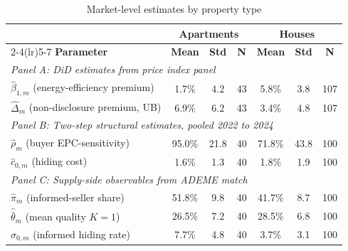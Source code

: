 \documentclass[10pt,letterpaper]{bp-template-concise}
\begin{document}
\begin{table}[H]
\centering
\caption{Market-level estimates by property type}
\label{tab:did_results}
\small\renewcommand{\arraystretch}{1.3}
\begin{tabular*}{\textwidth}{@{\extracolsep{\fill}}l*{6}{c}@{}}
\toprule\toprule
 & \multicolumn{3}{c}{\textbf{Apartments}} & \multicolumn{3}{c}{\textbf{Houses}} \\
\cmidrule(lr){2-4}\cmidrule(lr){5-7}
\textbf{Parameter} & \textbf{Mean} & \textbf{Std} & \textbf{N} & \textbf{Mean} & \textbf{Std} & \textbf{N} \\
\midrule
\multicolumn{7}{l}{\textit{Panel A: DiD estimates from price index panel}} \\[2pt]
$\hat\beta_{1,m}$ (energy-efficiency premium) & 1.7\% & 4.2 & 43  & 5.8\% & 3.8 & 107 \\
$\hat\Delta_m$ (non-disclosure premium, UB)   & 6.9\% & 6.2 & 43  & 3.4\% & 4.8 & 107 \\
\midrule
\multicolumn{7}{l}{\textit{Panel B: Two-step structural estimates, pooled 2022 to 2024}} \\[2pt]
$\hat\rho_m$ (buyer EPC-sensitivity)          & 95.0\% & 21.8 & 40 & 71.8\% & 43.8 & 100 \\
$\hat c_{0,m}$ (hiding cost)                  &  1.6\% &  1.3 & 40 &  1.8\% &  1.9 & 100 \\
\midrule
\multicolumn{7}{l}{\textit{Panel C: Supply-side observables from ADEME match}} \\[2pt]
$\hat\pi_m$ (informed-seller share)           & 51.8\% &  9.8 & 40 & 41.7\% &  8.7 & 100 \\
$\hat{\bar\theta}_m$ (mean quality $K{=}1$)   & 26.5\% &  7.2 & 40 & 28.5\% &  6.8 & 100 \\
$\hat\sigma_{0,m}$ (informed hiding rate)     &  7.7\% &  4.8 & 40 &  3.7\% &  3.1 & 100 \\
\bottomrule\bottomrule
\end{tabular*}
\vspace{0.5em}
\begin{minipage}{\linewidth}

\end{minipage}
\end{table}
\end{document}
